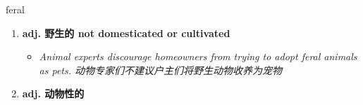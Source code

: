 
\begin{frame}
{\huge feral}
\begin{center}
\begin{enumerate}\Large
  \item \textbf{adj. 野生的 not domesticated or cultivated}
  \begin{itemize}
    \item \em{\Large{Animal experts discourage homeowners from trying to adopt feral animals as pets. 动物专家们不建议户主们将野生动物收养为宠物}}
  \end{itemize}
  \item \textbf{adj. 动物性的}
\end{enumerate}
\end{center}
\end{frame}
